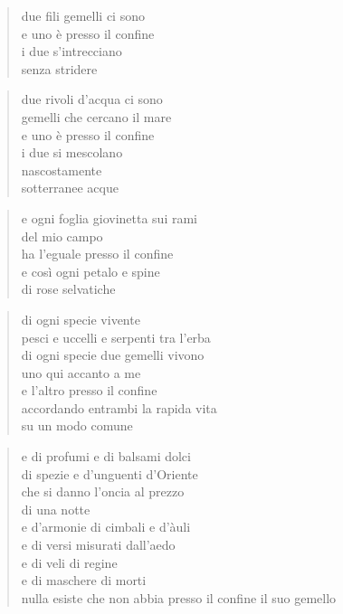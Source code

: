 \clearpage


\vspace*{2cm}

	\begin{verse}
		due fili gemelli ci sono\\
		e uno è presso il confine\\
		i due s’intrecciano\\
		senza stridere
	\end{verse}

	\begin{verse}
		due rivoli d’acqua ci sono\\
		gemelli che cercano il mare\\
		e uno è presso il confine\\
		i due si mescolano\\
		nascostamente\\
		sotterranee acque
	\end{verse}

	\begin{verse}
		e ogni foglia giovinetta sui rami\\
		del mio campo\\
		ha l’eguale presso il confine\\
		e così ogni petalo e spine\\
		di rose selvatiche
	\end{verse}

	\begin{verse}
		di ogni specie vivente\\
		pesci e uccelli e serpenti tra l’erba\\
		di ogni specie due gemelli vivono\\
		uno qui accanto a me\\
		e l’altro presso il confine\\
		accordando entrambi la rapida vita\\
		su un modo comune
	\end{verse}

	\begin{verse}
		e di profumi e di balsami dolci\\
		di spezie e d’unguenti d’Oriente\\
		che si danno l’oncia al prezzo\\
		di una notte\\
		e d’armonie di cimbali e d’àuli\\
		e di versi misurati dall’aedo\\
		e di veli di regine\\
		e di maschere di morti\\
		nulla esiste che non abbia
		presso il confine il suo gemello
	\end{verse}

